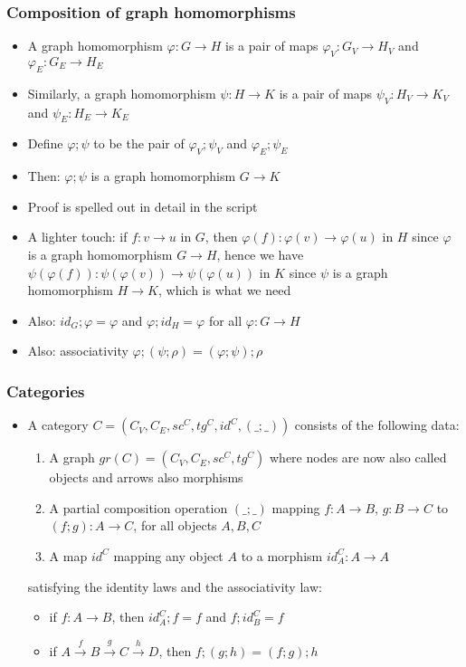 \documentclass[handout]{beamer}
\begin{document}
\frame
  {   
    \frametitle{Composition of graph homomorphisms}\label{Ch2:Ghom-comp}

 \begin{itemize}[<+->]
\item A graph homomorphism $\varphi: G\to H$ is a pair of maps
$\varphi_V : G_V \to H_V$ and $\varphi_E : G_E \to H_E$
\item Similarly, a graph homomorphism $\psi: H\to K$ is a pair of maps
$\psi_V : H_V \to K_V$ and $\psi_E : H_E \to K_E$
\item Define $\varphi;\psi$ to be the pair of $\varphi_V;\psi_V$ and $\varphi_E;\psi_E$
\item Then: $\varphi;\psi$ is a graph homomorphism $G\to K$
\item Proof is spelled out in detail in the script
\item A lighter touch: if $f: v\to u$ in $G$, 
then $\varphi(f): \varphi(v)\to \varphi(u)$ in $H$
since $\varphi$ is a graph homomorphism $G\to H$, 
hence we have $\psi(\varphi(f)): \psi(\varphi(v))\to \psi(\varphi(u))$ in $K$
since $\psi$ is a graph homomorphism $H\to K$, 
which is what we need 
\item Also: $id_G ; \varphi = \varphi$ and $\varphi; id_H = \varphi$ for all $\varphi:G\to H$
 \item Also: associativity $\varphi;(\psi;\rho) = (\varphi;\psi);\rho$
 \end{itemize}

 }


\frame
  {   
    \frametitle{Categories}\label{Ch2:categories}

 \begin{itemize}[<+->]
\item A category $C = (C_V,C_E,sc^C, tg^C, id^C,(\_;\_))$ consists of the following data:
   \begin{enumerate}[<+->]
\item A graph $gr(C) =  (C_V,C_E,sc^C, tg^C)$ where nodes are now also called objects
and arrows also morphisms
\item A partial composition operation $(\_;\_)$ mapping $f: A\to B$, $g: B\to C$
to $(f;g): A\to C$, for all objects $A,B,C$
\item A map $id^C$ mapping any object $A$ to a morphism $id^C_A: A\to A$
   \end{enumerate}
satisfying the identity laws and the associativity law:
   \begin{itemize}[<+->]
\item if $f: A\to B$, then $id^C_A;f = f$ and  $f;id^C_B = f$
\item if $A \stackrel{f}{\to} B \stackrel{g}{\to} C \stackrel{h}{\to}D $, then $f;(g;h)=(f;g);h$
   \end{itemize}
 \end{itemize}

 }
\end{document}
